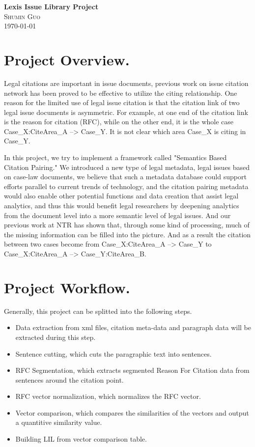 \documentclass[12pt]{article}
\begin{document}
\begin{center}                  %
\textbf{\Large{Lexis Issue Library Project}} \\ 
\small\textsc{Shumin Guo} \\
\today
\end{center}

\section{Project Overview.}
Legal citations are important in issue documents, previous work on
issue citation network has been proved to be effective to utilize the
citing relationship. One reason for the limited use of legal issue
citation is that the citation link of two legal issue documents is
asymmetric. For example, at one end of the citation link is the reason
for citation (RFC), while on the other end, it is the whole case
Case_X:CiteArea_A --> Case_Y. It is not clear which area Case_X is
citing in Case_Y.

In this project, we try to implement a framework called "Semantics
Based Citation Pairing." We introduced a new type of legal metadata,
legal issues based on case-law documents, we believe that such a
metadata database could support efforts parallel to current trends of
technology, and the citation pairing metadata would also enable other
potential functions and data creation that assist legal analytics, and
thus this would benefit legal researchers by deepening analytics from
the document level into a more semantic level of legal issues. And our
previous work at NTR has shown that, through some kind of processing,
much of the missing information can be filled into the picture. And as
a result the citation between two cases become from Case_X:CiteArea_A
--> Case_Y to Case_X:CiteArea_A --> Case_Y:CiteArea_B.  

\section{Project Workflow.}
Generally, this project can be splitted into the following steps. 
\begin{itemize}
\item Data extraction from xml files, citation meta-data and paragraph
  data will be extracted during this step. 
\item Sentence cutting, which cuts the paragraphic text into
  sentences. 
\item RFC Segmentation, which extracts segmented Reason For Citation
  data from sentences around the citation point. 
\item RFC vector normalization, which normalizes the RFC vector. 
\item Vector comparison, which compares the similarities of the
  vectors and output a quantitive similarity value. 
\item Building LIL from vector comparison table. 
\end{itemize}
\end{document}
